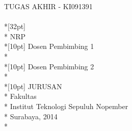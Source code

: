 \newpage
    \large
    \sffamily
    \thispagestyle{empty}
    \color{white}
    \flushleft
    TUGAS AKHIR - KI091391 \\
    {\rmfamily\textbf{\MakeUppercase{\judul}}} \\*[32pt]
    \penulis \\*
    NRP \nrp \\*[10pt]
    Dosen Pembimbing 1 \\*
    \pembimbingSatu \\*[10pt]
    Dosen Pembimbing 2 \\*
    \pembimbingDua \\*[10pt]
    JURUSAN \MakeUppercase{\jurusan} \\*
    Fakultas \fakultas \\*
    Institut Teknologi Sepuluh Nopember \\*
    Surabaya, 2014 \\*
    \rmfamily
    \normalsize
    \restoregeometry
    \color{black}
    \cleardoublepage


